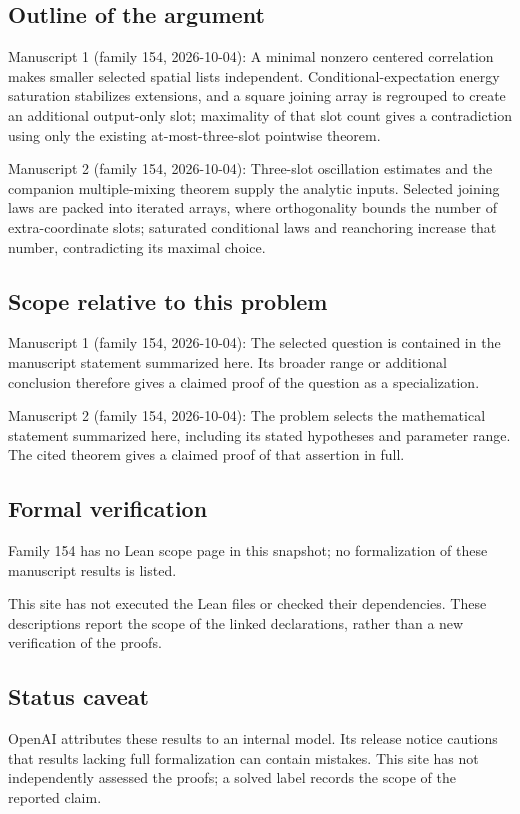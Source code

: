 \documentclass[11pt]{article}
\begin{document}
\subsection{Outline of the argument}
Manuscript 1 (family 154, 2026-10-04): A minimal nonzero centered correlation makes smaller selected spatial lists independent. Conditional-expectation energy saturation stabilizes extensions, and a square joining array is regrouped to create an additional output-only slot; maximality of that slot count gives a contradiction using only the existing at-most-three-slot pointwise theorem.

Manuscript 2 (family 154, 2026-10-04): Three-slot oscillation estimates and the companion multiple-mixing theorem supply the analytic inputs. Selected joining laws are packed into iterated arrays, where orthogonality bounds the number of extra-coordinate slots; saturated conditional laws and reanchoring increase that number, contradicting its maximal choice.

\subsection{Scope relative to this problem}
Manuscript 1 (family 154, 2026-10-04): The selected question is contained in the manuscript statement summarized here. Its broader range or additional conclusion therefore gives a claimed proof of the question as a specialization.

Manuscript 2 (family 154, 2026-10-04): The problem selects the mathematical statement summarized here, including its stated hypotheses and parameter range. The cited theorem gives a claimed proof of that assertion in full.

\subsection{Formal verification}
Family 154 has no Lean scope page in this snapshot; no formalization of these manuscript results is listed.

This site has not executed the Lean files or checked their dependencies. These descriptions report the scope of the linked declarations, rather than a new verification of the proofs.

\subsection{Status caveat}
OpenAI attributes these results to an internal model. Its release notice cautions that results lacking full formalization can contain mistakes. This site has not independently assessed the proofs; a solved label records the scope of the reported claim.
\end{document}
